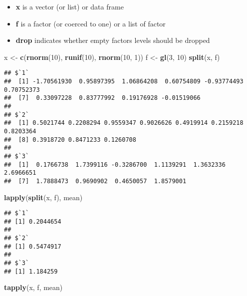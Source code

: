 \documentclass[
]{article}
\newenvironment{Shaded}{\begin{snugshade}}{\end{snugshade}}
\newcommand{\DecValTok}[1]{\textcolor[rgb]{0.00,0.00,0.81}{#1}}
\newcommand{\KeywordTok}[1]{\textcolor[rgb]{0.13,0.29,0.53}{\textbf{#1}}}
\newcommand{\NormalTok}[1]{#1}
\newcommand{\StringTok}[1]{\textcolor[rgb]{0.31,0.60,0.02}{#1}}
\providecommand{\tightlist}{%
  \setlength{\itemsep}{0pt}\setlength{\parskip}{0pt}}
\begin{document}
\begin{itemize}
\tightlist
\item
  \textbf{x} is a vector (or list) or data frame
\item
  \textbf{f} is a factor (or coerced to one) or a list of factor
\item
  \textbf{drop} indicates whether empty factors levels should be dropped
\end{itemize}

\begin{Shaded}
\begin{Highlighting}[]
\NormalTok{x \textless{}{-}}\StringTok{ }\KeywordTok{c}\NormalTok{(}\KeywordTok{rnorm}\NormalTok{(}\DecValTok{10}\NormalTok{), }\KeywordTok{runif}\NormalTok{(}\DecValTok{10}\NormalTok{), }\KeywordTok{rnorm}\NormalTok{(}\DecValTok{10}\NormalTok{, }\DecValTok{1}\NormalTok{))}
\NormalTok{f \textless{}{-}}\StringTok{ }\KeywordTok{gl}\NormalTok{(}\DecValTok{3}\NormalTok{, }\DecValTok{10}\NormalTok{)}
\KeywordTok{split}\NormalTok{(x, f)}
\end{Highlighting}
\end{Shaded}

\begin{verbatim}
## $`1`
##  [1] -1.70561930  0.95897395  1.06864208  0.60754809 -0.93774493  0.70752373
##  [7]  0.33097228  0.83777992  0.19176928 -0.01519066
## 
## $`2`
##  [1] 0.5021744 0.2208294 0.9559347 0.9026626 0.4919914 0.2159218 0.8203364
##  [8] 0.3918720 0.8471233 0.1260708
## 
## $`3`
##  [1]  0.1766738  1.7399116 -0.3286700  1.1139291  1.3632336  2.6966651
##  [7]  1.7888473  0.9690902  0.4650057  1.8579001
\end{verbatim}

\begin{Shaded}
\begin{Highlighting}[]
\KeywordTok{lapply}\NormalTok{(}\KeywordTok{split}\NormalTok{(x, f), mean)}
\end{Highlighting}
\end{Shaded}

\begin{verbatim}
## $`1`
## [1] 0.2044654
## 
## $`2`
## [1] 0.5474917
## 
## $`3`
## [1] 1.184259
\end{verbatim}

\begin{Shaded}
\begin{Highlighting}[]
\KeywordTok{tapply}\NormalTok{(x, f, mean)}
\end{Highlighting}
\end{Shaded}
\end{document}
